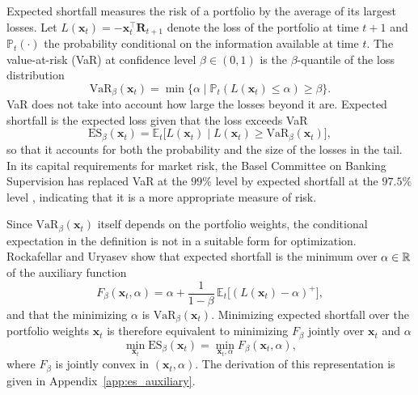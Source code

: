 Expected shortfall measures the risk of a portfolio by the average of its largest losses. Let
$L(\bm{x}_t) = -\bm{x}_t^\top \bm{R}_{t+1}$ denote the loss of the portfolio at time $t+1$ and $\mathbb{P}_t(\cdot)$
the probability conditional on the information available at time $t$. The value-at-risk (VaR) at confidence level
$\beta \in (0, 1)$ is the $\beta$-quantile of the loss distribution
\begin{equation*}
    \text{VaR}_\beta(\bm{x}_t) = \min \{ \alpha \mid \mathbb{P}_t(L(\bm{x}_t) \le \alpha) \ge \beta \}.
\end{equation*}
VaR does not take into account how large the losses beyond it are. Expected shortfall is the expected loss given that
the loss exceeds VaR
\begin{equation*}
    \text{ES}_\beta(\bm{x}_t) = \mathbb{E}_t\bigl[ L(\bm{x}_t) \mid L(\bm{x}_t) \ge \text{VaR}_\beta(\bm{x}_t) \bigr],
\end{equation*}
so that it accounts for both the probability and the size of the losses in the tail. 
In its capital requirements for market risk, the Basel Committee on Banking
Supervision has replaced VaR at the $99\%$ level by expected shortfall at the $97.5\%$ level \cite{BCBS2019}, indicating
that it is a more appropriate measure of risk.

Since $\text{VaR}_\beta(\bm{x}_t)$ itself depends on the portfolio weights, the conditional expectation in the definition is not
in a suitable form for optimization. Rockafellar and Uryasev \cite{RockafellarUryasev2000, RockafellarUryasev2002} show
that expected shortfall is the minimum over $\alpha \in \mathbb{R}$ of the auxiliary function
\begin{equation*}
    F_\beta(\bm{x}_t, \alpha) = \alpha + \frac{1}{1-\beta}\, \mathbb{E}_t\bigl[ (L(\bm{x}_t) - \alpha)^+ \bigr],
\end{equation*}  
and that the minimizing $\alpha$ is $\text{VaR}_\beta(\bm{x}_t)$. Minimizing expected shortfall over the portfolio weights $\bm{x}_t$ is
therefore equivalent to minimizing $F_\beta$ jointly over $\bm{x}_t$ and $\alpha$
\begin{equation*}
    \min_{\bm{x}_t} \text{ES}_\beta(\bm{x}_t) = \min_{\bm{x}_t, \alpha} F_\beta(\bm{x}_t, \alpha),
\end{equation*}
where $F_\beta$ is jointly convex in $(\bm{x}_t, \alpha)$. The derivation of this representation is given in Appendix~\ref{app:es_auxiliary}.

